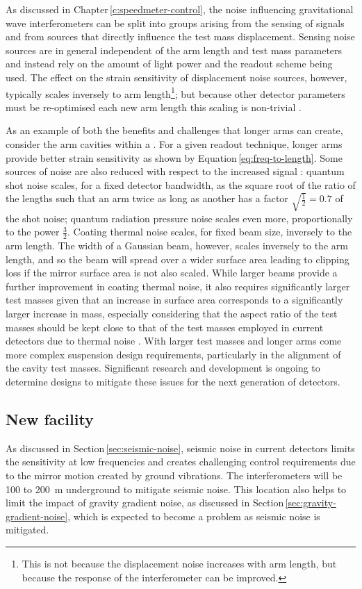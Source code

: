 As discussed in Chapter\,\ref{c:speedmeter-control}, the noise influencing gravitational wave interferometers can be split into groups arising from the sensing of signals and from sources that directly influence the test mass displacement. Sensing noise sources are in general independent of the arm length and test mass parameters and instead rely on the amount of light power and the readout scheme being used. The effect on the strain sensitivity of displacement noise sources, however, typically scales inversely to arm length\footnote{This is not because the displacement noise increases with arm length, but because the response of the interferometer can be improved.}; but because other detector parameters must be re-optimised each new arm length this scaling is non-trivial \cite{Dwyer2015}.

As an example of both the benefits and challenges that longer arms can create, consider the arm cavities within a \FPMI{}. For a given readout technique, longer arms provide better strain sensitivity as shown by Equation\,\ref{eq:freq-to-length}. Some sources of noise are also reduced with respect to the increased signal \cite{aligocosmic2016}: quantum shot noise scales, for a fixed detector bandwidth, as the square root of the ratio of the lengths such that an arm twice as long as another has a factor $\sqrt{\frac{1}{2}} = 0.7$ of the shot noise; quantum radiation pressure noise scales even more, proportionally to the power $\frac{3}{2}$. Coating thermal noise scales, for fixed beam size, inversely to the arm length. The width of a Gaussian beam, however, scales inversely to the arm length, and so the beam will spread over a wider surface area leading to clipping loss if the mirror surface area is not also scaled. While larger beams provide a further improvement in coating thermal noise, it also requires significantly larger test masses given that an increase in surface area corresponds to a significantly larger increase in mass, especially considering that the aspect ratio of the test masses should be kept close to that of the test masses employed in current detectors due to thermal noise \cite{Somiya2009a}. With larger test masses and longer arms come more complex suspension design requirements, particularly in the alignment of the cavity test masses. Significant research and development is ongoing to determine designs to mitigate these issues for the next generation of detectors.

\subsection{New facility}
As discussed in Section\,\ref{sec:seismic-noise}, seismic noise in current detectors limits the sensitivity at low frequencies and creates challenging control requirements due to the mirror motion created by ground vibrations. The \ET{} interferometers will be \num{100} to \SI{200}{\meter} underground to mitigate seismic noise. This location also helps to limit the impact of gravity gradient noise, as discussed in Section\,\ref{sec:gravity-gradient-noise}, which is expected to become a problem as seismic noise is mitigated.

